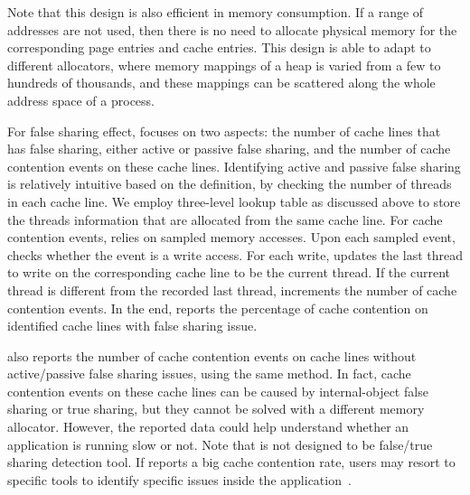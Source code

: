 Note that this design is also efficient in memory consumption. If a range of addresses are not used, then there is no need to allocate physical memory for the corresponding page entries and cache entries. This design is able to adapt to different allocators, where memory mappings of a heap is varied from a few to hundreds of thousands, and these mappings can be scattered along the whole address space of a process. 

For false sharing effect, \MP{} focuses on two aspects: the number of cache lines that has false sharing, either active or passive false sharing, and the number of cache contention events on these cache lines. Identifying active and passive false sharing is relatively intuitive based on the definition, by checking the number of threads in each cache line. We employ three-level lookup table as discussed above to store the threads information that are allocated from the same cache line. 
For cache contention events, \MP{} relies on sampled memory accesses. Upon each sampled event, \MP{} checks whether the event is a write access. For each write, \MP{} updates the last thread to write on the corresponding cache line to be the current thread. If the current thread is different from the recorded last thread, \MP{} increments the number of cache contention events. In the end, \MP{} reports the percentage of cache contention on identified cache lines with false sharing issue. 

\MP{} also reports the number of cache contention events on cache lines without active/passive false sharing issues, using the same method. In fact, cache contention events on these cache lines can be caused by internal-object false sharing or true sharing, but they cannot be solved with a different memory allocator. However, the reported data could help understand whether an application is running slow or not. Note that \MP{} is not designed to be false/true sharing detection tool. If \MP{} reports a big cache contention rate, users may resort to specific tools to identify specific issues inside the application~\cite{Sheriff, Predator, DBLP:conf/ppopp/ChabbiWL18}. 
   

